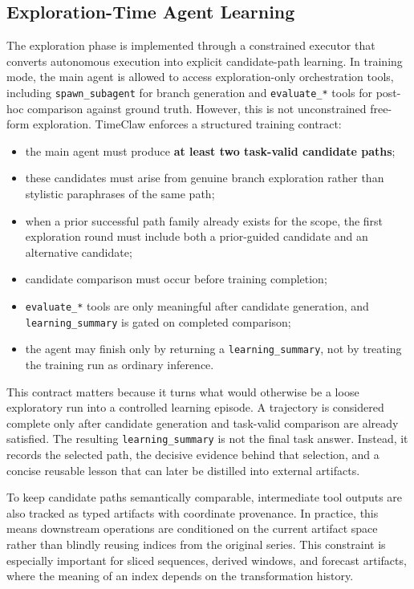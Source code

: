 \subsection{Exploration-Time Agent Learning}
\label{sec:exploration}

The exploration phase is implemented through a constrained executor that converts autonomous execution into explicit candidate-path learning. In training mode, the main agent is allowed to access exploration-only orchestration tools, including \texttt{spawn\_subagent} for branch generation and \texttt{evaluate\_*} tools for post-hoc comparison against ground truth. However, this is not unconstrained free-form exploration. TimeClaw enforces a structured training contract:
\begin{itemize}[leftmargin=*,itemsep=2pt]
    \item the main agent must produce \textbf{at least two task-valid candidate paths};
    \item these candidates must arise from genuine branch exploration rather than stylistic paraphrases of the same path;
    \item when a prior successful path family already exists for the scope, the first exploration round must include both a prior-guided candidate and an alternative candidate;
    \item candidate comparison must occur before training completion;
    \item \texttt{evaluate\_*} tools are only meaningful after candidate generation, and \texttt{learning\_summary} is gated on completed comparison;
    \item the agent may finish only by returning a \texttt{learning\_summary}, not by treating the training run as ordinary inference.
\end{itemize}

This contract matters because it turns what would otherwise be a loose exploratory run into a controlled learning episode. A trajectory is considered complete only after candidate generation and task-valid comparison are already satisfied. The resulting \texttt{learning\_summary} is not the final task answer. Instead, it records the selected path, the decisive evidence behind that selection, and a concise reusable lesson that can later be distilled into external artifacts.

To keep candidate paths semantically comparable, intermediate tool outputs are also tracked as typed artifacts with coordinate provenance. In practice, this means downstream operations are conditioned on the current artifact space rather than blindly reusing indices from the original series. This constraint is especially important for sliced sequences, derived windows, and forecast artifacts, where the meaning of an index depends on the transformation history.

